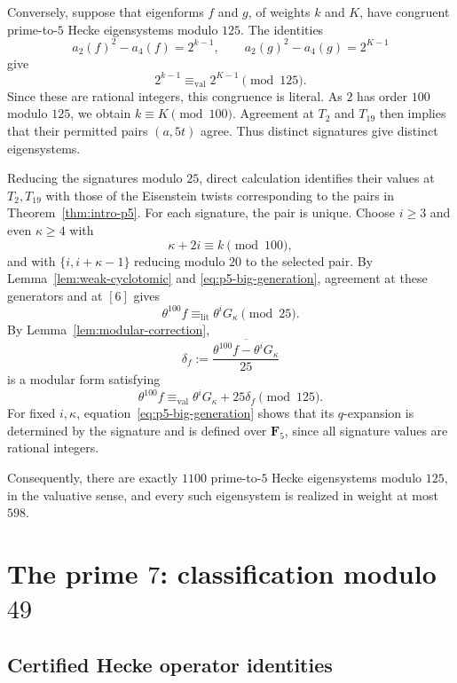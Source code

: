 \documentclass[11pt]{article}
\theoremstyle{plain}
\theoremstyle{definition}
\theoremstyle{remark}
\numberwithin{equation}{section}
\begin{document}
Conversely, suppose that eigenforms \(f\) and \(g\), of weights \(k\) and \(K\), have congruent prime-to-\(5\) Hecke eigensystems modulo \(125\). The identities \[ a_2(f)^2-a_4(f)=2^{k-1}, \qquad a_2(g)^2-a_4(g)=2^{K-1} \] give \[ 2^{k-1}\equiv_{\mathrm{val}}2^{K-1}\pmod{125}. \] Since these are rational integers, this congruence is literal. As \(2\) has order \(100\) modulo \(125\), we obtain \(k\equiv K\pmod{100}\). Agreement at \(T_2\) and \(T_{19}\) then implies that their permitted pairs \((a,5t)\) agree. Thus distinct signatures give distinct eigensystems.

Reducing the signatures modulo \(25\), direct calculation identifies their values at \(T_2,T_{19}\) with those of the Eisenstein twists corresponding to the pairs in Theorem~\ref{thm:intro-p5}. For each signature, the pair is unique. Choose \(i\geq3\) and even \(\kappa\geq4\) with \[ \kappa+2i\equiv k\pmod{100}, \] and with \(\{i,i+\kappa-1\}\) reducing modulo \(20\) to the selected pair. By Lemma~\ref{lem:weak-cyclotomic} and \eqref{eq:p5-big-generation}, agreement at these generators and at \([6]\) gives \[ \theta^{100}f\equiv_{\mathrm{lit}} \theta^iG_\kappa\pmod{25}. \] By Lemma~\ref{lem:modular-correction}, \[ \delta_f:= \overline{\frac{\theta^{100}f-\theta^iG_\kappa}{25}} \] is a modular form satisfying \[ \theta^{100}f\equiv_{\mathrm{val}} \theta^iG_\kappa+25\delta_f\pmod{125}. \] For fixed \(i,\kappa\), equation~\eqref{eq:p5-big-generation} shows that its \(q\)-expansion is determined by the signature and is defined over \(\mathbf F_5\), since all signature values are rational integers.

Consequently, there are exactly \(1100\) prime-to-\(5\) Hecke eigensystems modulo \(125\), in the valuative sense, and every such eigensystem is realized in weight at most \(598\).


\section{The prime \texorpdfstring{\(7\)}{7}: classification modulo
\texorpdfstring{\(49\)}{49}}
\label{sec:p7}

\subsection{Certified Hecke operator identities}
\end{document}
